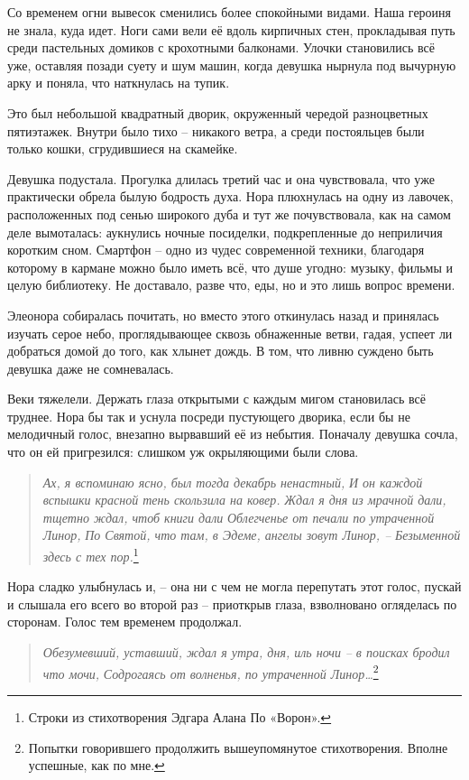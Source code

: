 \documentclass[
  a5paperpaper,
  DIV=11,
  numbers=noendperiod]{scrreprt}
\begin{document}
Со временем огни вывесок сменились более спокойными видами. Наша героиня
не знала, куда идет. Ноги сами вели её вдоль кирпичных стен, прокладывая
путь среди пастельных домиков с крохотными балконами. Улочки становились
всё уже, оставляя позади суету и шум машин, когда девушка нырнула под
вычурную арку и поняла, что наткнулась на тупик.

Это был небольшой квадратный дворик, окруженный чередой разноцветных
пятиэтажек. Внутри было тихо -- никакого ветра, а среди постояльцев были
только кошки, сгрудившиеся на скамейке.

Девушка подустала. Прогулка длилась третий час и она чувствовала, что
уже практически обрела былую бодрость духа. Нора плюхнулась на одну из
лавочек, расположенных под сенью широкого дуба и тут же почувствовала,
как на самом деле вымоталась: аукнулись ночные посиделки, подкрепленные
до неприличия коротким сном. Смартфон -- одно из чудес современной
техники, благодаря которому в кармане можно было иметь всё, что душе
угодно: музыку, фильмы и целую библиотеку. Не доставало, разве что, еды,
но и это лишь вопрос времени.

Элеонора собиралась почитать, но вместо этого откинулась назад и
принялась изучать серое небо, проглядывающее сквозь обнаженные ветви,
гадая, успеет ли добраться домой до того, как хлынет дождь. В том, что
ливню суждено быть девушка даже не сомневалась.

Веки тяжелели. Держать глаза открытыми с каждым мигом становилась всё
труднее. Нора бы так и уснула посреди пустующего дворика, если бы не
мелодичный голос, внезапно вырвавший её из небытия. Поначалу девушка
сочла, что он ей пригрезился: слишком уж окрыляющими были слова.

\begin{quote}
\emph{Ах, я вспоминаю ясно, был тогда декабрь ненастный,} \emph{И он
каждой вспышки красной тень скользила на ковер.} \emph{Ждал я дня из
мрачной дали, тщетно ждал, чтоб книги дали} \emph{Облегченье от печали
по утраченной Линор,} \emph{По Святой, что там, в Эдеме, ангелы зовут
Линор, --} \emph{Безыменной здесь с тех пор.}\footnote{Строки из
  стихотворения Эдгара Алана По «Ворон».}
\end{quote}

Нора сладко улыбнулась и, -- она ни с чем не могла перепутать этот
голос, пускай и слышала его всего во второй раз -- приоткрыв глаза,
взволновано огляделась по сторонам. Голос тем временем продолжал.

\begin{quote}
\emph{Обезумевший, уставший, ждал я утра, дня, иль ночи } \emph{-- в
поисках бродил что мочи,} \emph{Содрогаясь от волненья, по утраченной
Линор\ldots{}}\footnote{Попытки говорившего продолжить вышеупомянутое
  стихотворения. Вполне успешные, как по мне.}
\end{quote}
\end{document}
